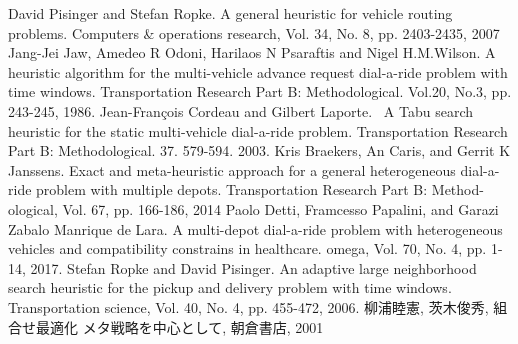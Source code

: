 \documentclass[uplatex]{ujreport}
\begin{document}
\begin{thebibliography}{99}
   David Pisinger and Stefan Ropke. A general heuristic for vehicle routing problems. Computers & operations research, Vol. 34, No. 8, pp. 2403-2435, 2007
  Jang-Jei Jaw, Amedeo R Odoni, Harilaos N Psaraftis and Nigel H.M.Wilson. A heuristic algorithm for the multi-vehicle advance request dial-a-ride problem with time windows. Transportation Research Part B: Methodological. Vol.20, No.3, pp. 243-245, 1986.
  Jean-François Cordeau and Gilbert Laporte.  \, A Tabu search heuristic for the static multi-vehicle dial-a-ride problem. Transportation Research Part B: Methodological. 37. 579-594. 2003.
  Kris Braekers, An Caris, and Gerrit K Janssens. Exact and meta-heuristic approach for a general heterogeneous dial-a-ride problem with multiple depots. Transportation Research Part B: Method- ological, Vol. 67, pp. 166-186, 2014
  Paolo Detti, Framcesso Papalini, and Garazi Zabalo Manrique de Lara. A multi-depot dial-a-ride problem with heterogeneous vehicles and compatibility constrains in healthcare. omega, Vol. 70, No. 4, pp. 1-14, 2017.
  Stefan Ropke and David Pisinger. An adaptive large neighborhood search heuristic for the pickup and delivery problem with time windows. Transportation science, Vol. 40, No. 4, pp. 455-472, 2006.
  柳浦睦憲, 茨木俊秀, 組合せ最適化 メタ戦略を中心として, 朝倉書店, 2001
\end{thebibliography}
\end{document}
